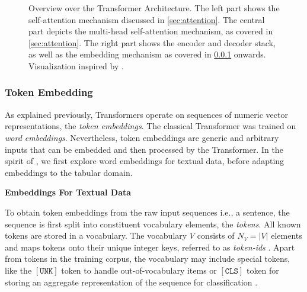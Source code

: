 \begin{landscape}
    \begin{figure}[ht]
        \centering
        {\renewcommand\normalsize{\scriptsize}%
            \normalsize
            }
        \caption[Overview Over the Transformer Architecture]{Overview over the Transformer Architecture. The left part shows the self-attention mechanism discussed in \cref{sec:attention}. The central part depicts the multi-head self-attention mechanism, as covered in \cref{sec:attention}. The right part shows the encoder and decoder stack, as well as the \gls{embedding} mechanism as covered in \cref{sec:token-embeddings} onwards. Visualization inspired by \textcite[][3]{tayEfficientTransformersSurvey2022}.}
        \label{fig:transformer-architecture-overview}
    \end{figure}
\end{landscape}

\subsubsection{Token Embedding}\label{sec:token-embeddings}

As explained previously, Transformers operate on sequences of numeric vector representations, the \emph{token embeddings}. The classical Transformer was trained on \emph{word embeddings}. Nevertheless, \gls{token} embeddings are generic and arbitrary inputs that can be embedded and then processed by the Transformer. In the spirit of \textcite[][6005]{vaswaniAttentionAllYou2017}, we first explore word embeddings for textual data, before adapting embeddings to the tabular domain.

\textbf{Embeddings For Textual Data}

To obtain \gls{token} embeddings from the raw input sequences i.e., a sentence, the sequence is first split into constituent vocabulary elements, the \emph{tokens}. All known \glspl{token} are stored in a vocabulary. The vocabulary $V$ consists of $N_{V}=|V|$ elements and maps \glspl{token} onto their unique integer keys, referred to as \emph{token-ids} \autocite[][3]{phuongFormalAlgorithmsTransformers2022}. Apart from \glspl{token} in the training corpus, the vocabulary may include special \glspl{token}, like the $\mathtt{[UNK]}$ \gls{token} to handle out-of-vocabulary items or $\mathtt{[CLS]}$ \gls{token} for storing an aggregate representation of the sequence for classification \autocite[cp.][4]{devlinBERTPretrainingDeep2019}.

